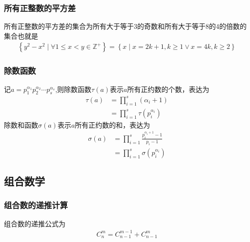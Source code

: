 \documentclass{code}
\begin{document}
\subsubsection{所有正整数的平方差}
所有正整数的平方差的集合为所有大于等于$3$的奇数和所有大于等于$8$的$4$的倍数的集合也就是
\begin{align*}
    \left\{y^2-x^2\mid\forall 1\leqslant x<y\in \mathbb{Z}^+\right\}=\left\{x\mid x=2k+1,k\geqslant 1\vee x=4k,k\geqslant 2\right\}
\end{align*}
\subsubsection{除数函数}
记$\displaystyle a=p_{1}^{\alpha_{1}}p_{2}^{\alpha_{2}}\cdots p_{s}^{\alpha_{s}}$,则除数函数$\tau \left(a\right)$表示$a$所有正约数的个数，表达为\begin{align*}
    \tau \left(a\right) &=\prod_{i=1}^{s}\left(\alpha_{i}+1\right)\\
    &=\prod_{i=1}^{s}\tau \left(p_{i}^{\alpha_{i}}\right)
\end{align*}
除数和函数$\sigma \left(a\right)$表示$a$所有正约数的和，表达为
\begin{align*}
    \sigma \left(a\right) &=\prod_{i=1}^{s}\frac{p_{i}^{\alpha_{i}+1}-1}{p_{i}-1}\\
    &=\prod_{i=1}^{s}\sigma \left(p_{i}^{\alpha_{i}}\right)
\end{align*}
\subsection{组合数学}
\subsubsection{组合数的递推计算}
组合数的递推公式为
\begin{align*}
    C_{n}^{m} = C_{n-1}^{m-1} + C_{n-1}^{m}
\end{align*}
\end{document}
